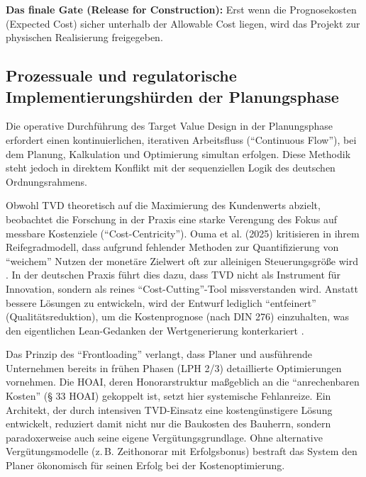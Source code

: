 \textbf{Das finale Gate (Release for Construction):}
Erst wenn die Prognosekosten (Expected Cost) sicher unterhalb der Allowable Cost liegen, wird das Projekt zur physischen Realisierung freigegeben.\autocite[Vgl.][S.~129]{hill_target_2017}



\subsection{Prozessuale und regulatorische Implementierungshürden der Planungsphase}
\label{sec:4.4.7}

Die operative Durchführung des Target Value Design in der Planungsphase erfordert einen kontinuierlichen, iterativen Arbeitsfluss (\enquote{Continuous Flow}), bei dem Planung, Kalkulation und Optimierung simultan erfolgen. Diese Methodik steht jedoch in direktem Konflikt mit der sequenziellen Logik des deutschen Ordnungsrahmens.

Obwohl \acs{TVD} theoretisch auf die Maximierung des Kundenwerts abzielt, beobachtet die Forschung in der Praxis eine starke Verengung des Fokus auf messbare Kostenziele (\enquote{Cost-Centricity}). Ouma et al. (2025) kritisieren in ihrem Reifegradmodell, dass aufgrund fehlender Methoden zur Quantifizierung von \enquote{weichem} Nutzen der monetäre Zielwert oft zur alleinigen Steuerungsgröße wird \autocite[Vgl.][S.~200]{ouma_target_2025}.
In der deutschen Praxis führt dies dazu, dass \acs{TVD} nicht als Instrument für Innovation, sondern als reines \enquote{Cost-Cutting}-Tool missverstanden wird. Anstatt bessere Lösungen zu entwickeln, wird der Entwurf lediglich \enquote{entfeinert} (Qualitätsreduktion), um die Kostenprognose (nach DIN 276) einzuhalten, was den eigentlichen Lean-Gedanken der Wertgenerierung konterkariert \autocite[Vgl.][S.~821]{miron_target_2015}.

Das Prinzip des \enquote{Frontloading} verlangt, dass Planer und ausführende Unternehmen bereits in frühen Phasen (\acs{LPH} 2/3) detaillierte Optimierungen vornehmen. Die \acs{HOAI}, deren Honorarstruktur maßgeblich an die \enquote{anrechenbaren Kosten} (§ 33 \acs{HOAI}) gekoppelt ist, setzt hier systemische Fehlanreize.
Ein Architekt, der durch intensiven \acs{TVD}-Einsatz eine kostengünstigere Lösung entwickelt, reduziert damit nicht nur die Baukosten des Bauherrn, sondern paradoxerweise auch seine eigene Vergütungsgrundlage. Ohne alternative Vergütungsmodelle (z.\,B. Zeithonorar mit Erfolgsbonus) bestraft das System den Planer ökonomisch für seinen Erfolg bei der Kostenoptimierung. \autocite[Vgl.][§ 4]{hoai_honorarordnung_2021}


